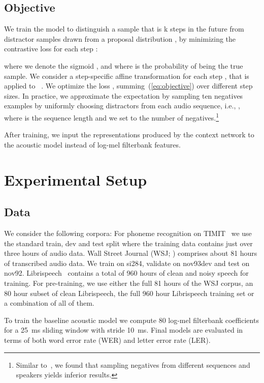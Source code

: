 \documentclass{article} \pdfoutput=1
\begin{document}
\subsection{Objective}
\label{sec:objective}

We train the model to distinguish a sample  that is k steps in the future from distractor samples  drawn from a proposal distribution , by minimizing the contrastive loss for each step :

where we denote the sigmoid , and where  is the probability of  being the true sample. We consider a step-specific affine transformation  for each step , that is applied to ~\citep{oord2018cpc}.
We optimize the loss , summing~(\ref{eq:objective}) over different step sizes.
In practice, we approximate the expectation by sampling ten negatives examples by uniformly choosing distractors from each audio sequence, i.e., , where  is the sequence length and we set  to the number of negatives.\footnote{Similar to~\citet{oord2018cpc}, we found that sampling negatives from different sequences and speakers yields inferior results.}

After training, we input the representations   produced by the context network to the acoustic model instead of log-mel filterbank features.

\section{Experimental Setup}
\label{sec:setup}


\subsection{Data}
\label{sec:data}

We consider the following corpora:
For phoneme recognition on TIMIT~\citep{garofolo1993timit} we use the standard train, dev and test split where the training data contains just over three hours of audio data.
Wall Street Journal (WSJ; \citet{garofolo1993wsj,woodland1994large}) comprises about 81 hours of transcribed audio data.
We train on si284, validate on nov93dev and test on nov92.
Librispeech~\citep{panayotov2015librispeech} contains a total of 960 hours of clean and noisy speech for training.
For pre-training, we use either the full 81 hours of the WSJ corpus, an 80 hour subset of clean Librispeech, the full 960 hour Librispeech training set or a combination of all of them.

To train the baseline acoustic model we compute 80 log-mel filterbank coefficients for a \SI{25}{\ms} sliding window with stride \SI{10}{\ms}.
Final models are evaluated in terms of both word error rate (WER) and letter error rate (LER).
\end{document}

